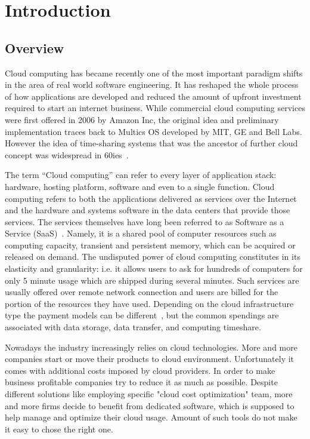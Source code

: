 \documentclass[licencjacka,en]{thesisclass}
\begin{document}
\chapter{Introduction}


    \section{Overview}

        Cloud computing has became recently one of the most important paradigm shifts in the area of real world software engineering.
        It has reshaped the whole process of how applications are developed and reduced the amount of upfront
        investment required to start an internet business. While commercial cloud computing services were first offered
        in 2006 by Amazon Inc, the original idea and preliminary implementation traces back to Multics OS developed by MIT,
        GE and Bell Labs. However the idea of time-sharing systems that was the ancestor of further cloud
        concept was widespread in 60ies~\cite{Markus}.

        The term “Cloud computing” can refer to every layer of application stack:
        hardware, hosting platform, software and even to a single function.
        Cloud computing refers to both the applications delivered as services over the Internet and
        the hardware and systems software in the data centers that provide those services.
        The services themselves have long been referred to as Software as a Service (SaaS)~\cite{Armbrust}.
        Namely, it is a shared pool of computer resources such as computing capacity,
        transient and persistent memory, which can be acquired or released on demand.
        The undisputed power of cloud computing constitutes in its elasticity and granularity:
        i.e. it allows users to ask for hundreds of computers for only 5 minute usage which
        are shipped during several minutes.
        Such services are usually offered over remote network connection and users are billed
        for the portion of the resources they have used.
        Depending on the cloud infrastructure type the payment models can be different~\cite{Laatikainen},
        but the common spendings are associated with data storage, data transfer, and computing timeshare.

        Nowadays the industry increasingly relies on cloud technologies. More and more companies start or move their products to cloud environment.
        Unfortunately it comes with additional costs imposed by cloud providers.
        In order to make business profitable companies try to reduce it as much as possible. Despite different solutions like employing specific "cloud cost optimization" team, more and more firms decide to benefit from dedicated software, which is supposed to help manage and optimize their cloud usage. Amount of such tools do not make it easy to chose the right one.
\end{document}
